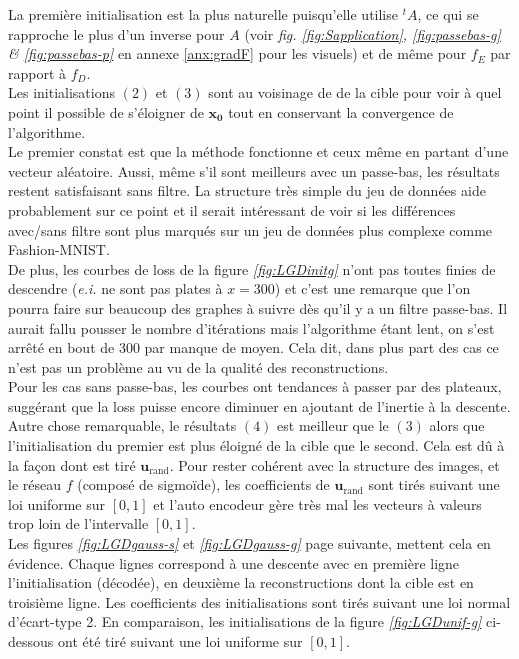 \documentclass[hidelinks, french]{article} %
\newcommand{\ei}{\textit{e.i. }}
\renewcommand{\bf}[1]{\boldsymbol{#1}}
\theoremstyle{enonce}
\theoremstyle{special}
\theoremstyle{rq}
\theoremstyle{exo}
\theoremstyle{demo}
\begin{document}
\noindent La première initialisation est la plus naturelle puisqu'elle utilise $^tA$, ce qui se rapproche le plus d'un inverse pour $A$ (voir \textit{fig. \ref{fig:Sapplication}, \ref{fig:passebas-g} \& \ref{fig:passebas-p}} en annexe \ref{anx:gradF} pour les visuels) et de même pour $f_E$ par rapport à $f_D$. 
\\
Les initialisations $(2)$ et $(3)$ sont au voisinage de de la cible  pour voir à quel point il possible de s'éloigner de $\bf{x_0}$ tout en conservant la convergence de l'algorithme.
\\

Le premier constat est que la méthode fonctionne et ceux même en partant d'une vecteur aléatoire.  Aussi, même s'il sont meilleurs avec un passe-bas, les résultats restent satisfaisant sans filtre. La structure très simple du jeu de données aide probablement sur ce point et il serait intéressant de voir si les différences avec/sans filtre sont plus marqués sur un jeu de données plus complexe comme Fashion-MNIST.
\\
De plus, les courbes de loss de la figure \textit{\ref{fig:LGDinitg}} n'ont pas toutes finies de descendre (\ei ne sont pas plates à $x=300$) et c'est une remarque que l'on pourra faire sur beaucoup des graphes à suivre dès qu'il y a un filtre passe-bas. Il aurait fallu pousser le nombre d'itérations mais l'algorithme étant lent, on s'est arrêté en bout de 300 par manque de moyen. Cela dit, dans plus part des cas ce n'est pas un problème au vu de la qualité des reconstructions.
\\
Pour les cas sans passe-bas, les courbes ont tendances à passer par des plateaux, suggérant que la loss puisse encore diminuer en ajoutant de l’inertie à la descente.
\\
 
Autre chose remarquable, le résultats $(4)$ est meilleur que le $(3)$ alors que l'initialisation du premier est plus éloigné de la cible que le second. Cela est dû à la façon dont est tiré $\bf{u}_{\text{rand}}$. Pour rester cohérent avec la structure des images, et le réseau $f$ (composé de sigmoïde), les coefficients de $\bf{u}_{\text{rand}}$ sont tirés suivant une loi uniforme sur $[0,1]$ et l'auto encodeur gère très mal les vecteurs à valeurs trop loin de l'intervalle $[0,1]$. 
\\
Les figures \textit{\ref{fig:LGDgauss-s}} et \textit{\ref{fig:LGDgauss-g}} page suivante, mettent cela en évidence. Chaque lignes correspond à une descente avec en première ligne l'initialisation (décodée), en deuxième la reconstructions dont la cible est en troisième ligne. Les coefficients des initialisations sont tirés suivant une loi normal d'écart-type 2. En comparaison, les initialisations de la figure \textit{\ref{fig:LGDunif-g}} ci-dessous ont été tiré suivant une loi uniforme sur $[0,1]$. 
\end{document}
